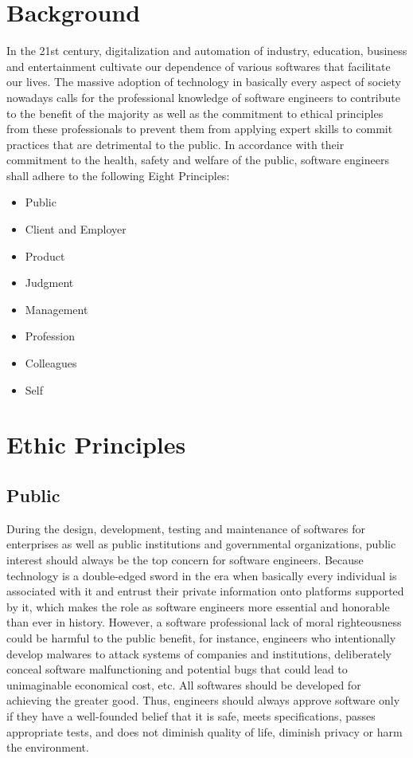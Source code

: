 \section{Background}

In the 21st century, digitalization and automation of industry, education, business and entertainment cultivate our dependence of various softwares that facilitate our lives. The massive adoption of technology in basically every aspect of society nowadays calls for the professional knowledge of software engineers to contribute to the benefit of the majority as well as the commitment  to ethical principles from these professionals to prevent them from applying expert skills to commit practices that are detrimental to the public. In accordance with their commitment to the health, safety and welfare of the public, software engineers shall adhere to the following Eight Principles\cite{Gotterbarn:1999:PST:308769.308770}: 

\begin{itemize}
	\item Public
	\item Client and Employer
	\item Product
	\item Judgment
	\item Management
	\item Profession
	\item Colleagues
	\item Self
\end{itemize}



\section{Ethic Principles}

\subsection{Public}

During the design, development, testing and maintenance of softwares for enterprises as well as public institutions and governmental organizations, public interest should always be the top concern for software engineers. Because technology is a double-edged sword in the era when basically every individual is associated with it and entrust their private information onto platforms supported by it, which makes the role as software engineers more essential and honorable than ever in history. However, a software professional lack of moral righteousness could be harmful to the public benefit, for instance, engineers who intentionally develop malwares to attack systems of companies and institutions, deliberately conceal software malfunctioning and potential bugs that could lead to unimaginable economical cost, etc. All softwares should be developed for achieving the greater good. Thus, engineers should always approve software only if they have a well-founded belief that it is safe, meets specifications, passes appropriate tests, and does not diminish quality of life, diminish privacy or harm the environment\cite{Gotterbarn:1999:PST:308769.308770}. 


